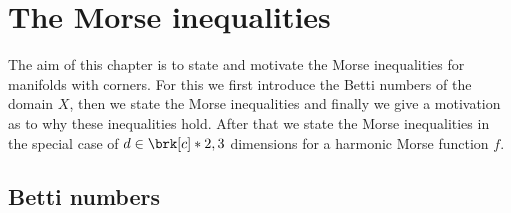 

\chapter{The Morse inequalities}\label{ch:Morse}

The aim of this chapter is to state and motivate the Morse inequalities for manifolds
with corners. For this we first introduce the Betti numbers of the domain $X$,
then we state the Morse inequalities and finally we give a motivation as to why these
inequalities hold.
After that we state the Morse inequalities in the special case of $d\in\brk[c]*{2,3}$ dimensions 
for a harmonic Morse function $f$.

\section{Betti numbers}



